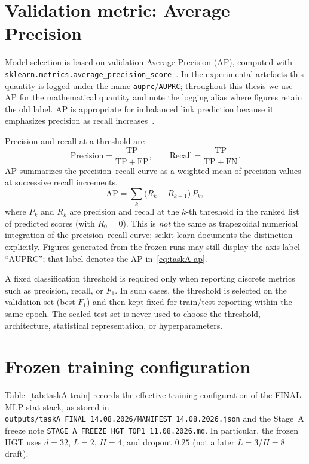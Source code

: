 \section{Validation metric: Average Precision}
\label{sec:taskA-ap}

Model selection is based on validation Average Precision (AP), computed with
\texttt{sklearn.metrics.average\_precision\_score}~\cite{sklearn}.
In the experimental artefacts this quantity is logged under the name \texttt{auprc}/\texttt{AUPRC}; throughout this thesis we use AP for the mathematical quantity and note the logging alias where figures retain the old label.
AP is appropriate for imbalanced link prediction because it emphasizes precision as recall increases~\cite{davis2006}.

Precision and recall at a threshold are
\begin{equation}
\label{eq:taskA-precision}
\mathrm{Precision}=\frac{\mathrm{TP}}{\mathrm{TP}+\mathrm{FP}},
\qquad
\mathrm{Recall}=\frac{\mathrm{TP}}{\mathrm{TP}+\mathrm{FN}}.
\end{equation}
AP summarizes the precision--recall curve as a weighted mean of precision values at successive recall increments,
\begin{equation}
\label{eq:taskA-ap}
\mathrm{AP}
=
\sum_{k}
\bigl(R_{k}-R_{k-1}\bigr)\,P_{k},
\end{equation}
where $P_{k}$ and $R_{k}$ are precision and recall at the $k$-th threshold in the ranked list of predicted scores (with $R_{0}=0$).
This is \emph{not} the same as trapezoidal numerical integration of the precision--recall curve; scikit-learn documents the distinction explicitly.
Figures generated from the frozen runs may still display the axis label ``AUPRC''; that label denotes the AP in~\eqref{eq:taskA-ap}.

A fixed classification threshold is required only when reporting discrete metrics such as precision, recall, or $F_{1}$.
In such cases, the threshold is selected on the validation set (best $F_{1}$) and then kept fixed for train/test reporting within the same epoch.
The sealed test set is never used to choose the threshold, architecture, statistical representation, or hyperparameters.

\section{Frozen training configuration}
\label{sec:taskA-train-config}

Table~\ref{tab:taskA-train} records the effective training configuration of the FINAL MLP-stat stack, as stored in
\texttt{outputs/taskA\_FINAL\_14.08.2026/MANIFEST\_14.08.2026.json}
and the Stage~A freeze note
\texttt{STAGE\_A\_FREEZE\_HGT\_TOP1\_11.08.2026.md}.
In particular, the frozen HGT uses $d=32$, $L=2$, $H=4$, and dropout $0.25$ (not a later $L{=}3$/$H{=}8$ draft).

